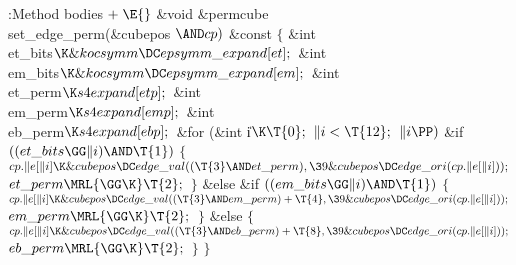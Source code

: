 \Y\B\4:Method bodies\X${}\mathrel+\E{}$\6
\&{void} \&{permcube}\DC\\{set\_edge\_perm}(\&{cubepos} ${}{\AND}\\{cp}){}$ %
\&{const}\1\1\2\2\6
${}\{{}$\1\6
\&{int} \\{et\_bits}${}\K\&{kocsymm}\DC\\{epsymm\_expand}[\\{et}];{}$\6
\&{int} \\{em\_bits}${}\K\&{kocsymm}\DC\\{epsymm\_expand}[\\{em}];{}$\6
\&{int} \\{et\_perm}${}\K\\{s4expand}[\\{etp}];{}$\6
\&{int} \\{em\_perm}${}\K\\{s4expand}[\\{emp}];{}$\6
\&{int} \\{eb\_perm}${}\K\\{s4expand}[\\{ebp}];{}$\7
\&{for} (\&{int} \|i${}\K\T{0};{}$ ${}\|i<\T{12};{}$ ${}\|i\PP){}$\1\6
\&{if} ${}((\\{et\_bits}\GG\|i)\AND\T{1}){}$\5
${}\{{}$\1\6
${}\\{cp}.\|e[\|i]\K\&{cubepos}\DC\\{edge\_val}((\T{3}\AND\\{et\_perm}),\39%
\&{cubepos}\DC\\{edge\_ori}(\\{cp}.\|e[\|i]));{}$\6
${}\\{et\_perm}\MRL{{\GG}{\K}}\T{2};{}$\6
\4${}\}{}$\2\6
\&{else} \&{if} ${}((\\{em\_bits}\GG\|i)\AND\T{1}){}$\5
${}\{{}$\1\6
${}\\{cp}.\|e[\|i]\K\&{cubepos}\DC\\{edge\_val}((\T{3}\AND\\{em\_perm})+\T{4},%
\39\&{cubepos}\DC\\{edge\_ori}(\\{cp}.\|e[\|i]));{}$\6
${}\\{em\_perm}\MRL{{\GG}{\K}}\T{2};{}$\6
\4${}\}{}$\2\6
\&{else}\5
${}\{{}$\1\6
${}\\{cp}.\|e[\|i]\K\&{cubepos}\DC\\{edge\_val}((\T{3}\AND\\{eb\_perm})+\T{8},%
\39\&{cubepos}\DC\\{edge\_ori}(\\{cp}.\|e[\|i]));{}$\6
${}\\{eb\_perm}\MRL{{\GG}{\K}}\T{2};{}$\6
\4${}\}{}$\2\2\6
\4${}\}{}$\2\par
\fi

